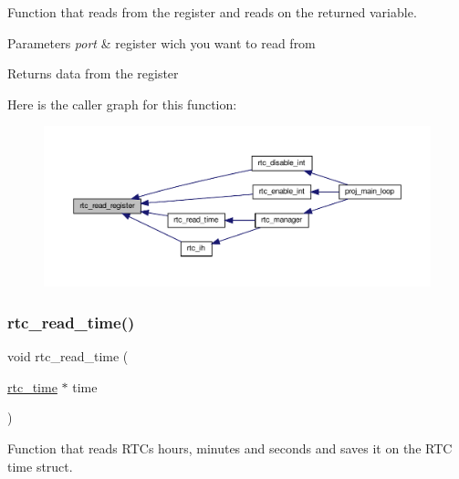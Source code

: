 Function that reads from the register and reads on the returned variable. 


\begin{DoxyParams}{Parameters}
{\em port} & register wich you want to read from\\
\hline
\end{DoxyParams}
\begin{DoxyReturn}{Returns}
data from the register 
\end{DoxyReturn}
Here is the caller graph for this function\+:
\nopagebreak
\begin{figure}[H]
\begin{center}
\leavevmode
\includegraphics[width=350pt]{group__rtc_ga72153103ac037b1a162a9099f001b83c_icgraph}
\end{center}
\end{figure}
\mbox{\label{group__rtc_ga94747f0e2c4ea5ae327017d78a25de30}} 
\subsubsection{\texorpdfstring{rtc\+\_\+read\+\_\+time()}{rtc\_read\_time()}}
{\footnotesize\ttfamily void rtc\+\_\+read\+\_\+time (\begin{DoxyParamCaption}\item[{\hyperlink{structrtc__time}{rtc\+\_\+time} $\ast$}]{time }\end{DoxyParamCaption})}



Function that reads R\+TC\textquotesingle{}s hours, minutes and seconds and saves it on the R\+TC time struct. 


